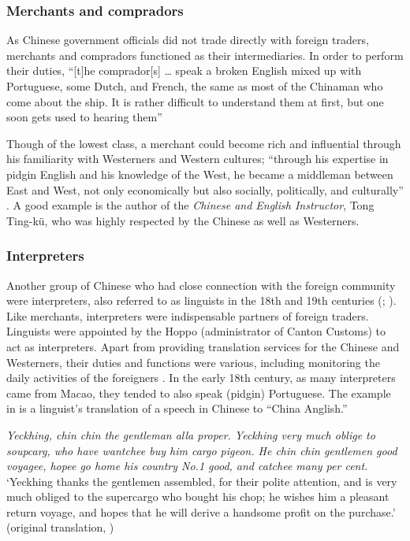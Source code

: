 \documentclass[output=paper]{langsci/langscibook}
\begin{document}
\subsubsection{Merchants and compradors}\label{sec:7:4.2.1}

As Chinese government officials did not trade directly with foreign traders, merchants and compradors functioned as their intermediaries. In order to perform their duties, “[t]he comprador[s] … speak a broken English mixed up with Portuguese, some Dutch, and French, the same as most of the Chinaman who come about the ship. It is rather difficult to understand them at first, but one soon gets used to hearing them”\citep[29]{tyng_before_1999}

Though of the lowest class, a merchant could become rich and influential through his familiarity with Westerners and Western cultures; “through his expertise in pidgin English and his knowledge of the West, he became a middleman between East and West, not only economically but also socially, politically, and culturally” \citep[180]{thao_du_1970}. A good example is the author of the \textit{Chinese and English Instructor}, Tong Ting-kü, who was highly respected by the Chinese as well as Westerners.

\subsubsection{Interpreters}\label{sec:7:4.2.2}

Another group of Chinese who had close connection with the foreign community were interpreters, also referred to as linguists in the 18th and 19th centuries (\citealt[50]{hunter_fan_1882}; \citealt{van_dyke_canton_2005}). Like merchants, interpreters were indispensable partners of foreign traders. Linguists were appointed by the Hoppo (administrator of Canton Customs) to act as interpreters. Apart from providing translation services for the Chinese and Westerners, their duties and functions were various, including monitoring the daily activities of the foreigners \citep{barreto_interpreters_2016}. In the early 18th century, as many interpreters came from Macao, they tended to also speak (pidgin) Portuguese. The example in  is a linguist’s translation of a speech in Chinese to “China Anglish.” 

\ea \label{ex:7:3}
    \textit{Yeckhing, chin chin the gentleman alla proper. Yeckhing very much oblige to soupcarg, who have wantchee buy him cargo pigeon. He chin chin gentlemen good voyagee, hopee go home his country No.1 good, and catchee many per cent.}\\
    \glt ‘Yeckhing thanks the gentlemen assembled, for their polite attention, and is very much obliged to the supercargo who bought his chop; he wishes him a pleasant return voyage, and hopes that he will derive a handsome profit on the purchase.’ (original translation, \citealt[126]{tiffany_canton_1849})
\z
\end{document}
